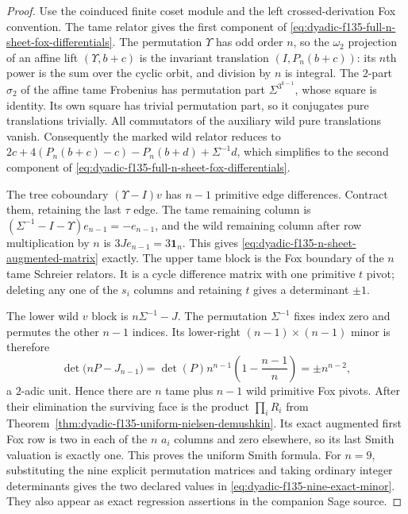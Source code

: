 \begin{proof}
Use the coinduced
finite coset module
and the left
crossed-derivation
Fox convention.
The tame relator
gives the first
component of
\eqref{eq:dyadic-f135-full-n-sheet-fox-differentials}.
The permutation
$\Upsilon$ has
odd order $n$,
so the $\omega_2$
projection of an
affine lift
$(\Upsilon,b+c)$
is the invariant
translation
$(I,P_n(b+c))$:
its $n$th power
is the sum over
the cyclic orbit,
and division by
$n$ is integral.
The $2$-part
$\sigma_2$ of
the affine tame
Frobenius has
permutation part
$\Sigma^{3^{k-1}}$,
whose square is
identity.
Its own square
has trivial
permutation part,
so it conjugates
pure translations
trivially.
All commutators
of the auxiliary
wild pure
translations vanish.
Consequently the
marked wild relator
reduces to
$2c+4(P_n(b+c)-c)
-P_n(b+d)+\Sigma^{-1}d$,
which simplifies
to the second
component of
\eqref{eq:dyadic-f135-full-n-sheet-fox-differentials}.

The tree coboundary
$(\Upsilon-I)v$
has $n-1$ primitive
edge differences.
Contract them,
retaining the last
$\tau$ edge.
The tame remaining
column is
$(\Sigma^{-1}-I-\Upsilon)
e_{n-1}=-e_{n-1}$,
and the wild
remaining column
after row
multiplication by
$n$ is
$3J e_{n-1}
=3\mathbf1_n$.
This gives
\eqref{eq:dyadic-f135-n-sheet-augmented-matrix}
exactly.
The upper tame
block is the
Fox boundary of
the $n$ tame
Schreier relators.
It is a cycle
difference matrix
with one
primitive $t$ pivot;
deleting any
one of the
$s_i$ columns
and retaining
$t$ gives a
determinant $\pm1$.

The lower wild
$v$ block is
$n\Sigma^{-1}-J$.
The permutation
$\Sigma^{-1}$
fixes index zero
and permutes the
other $n-1$
indices.
Its lower-right
$(n-1)\times(n-1)$
minor is therefore
\[
\det\bigl(
nP-J_{n-1}\bigr)
=\det(P)n^{n-1}
\left(1-\frac{n-1}{n}\right)
=\pm n^{n-2},
\]
a $2$-adic unit.
Hence there are
$n$ tame plus
$n-1$ wild
primitive Fox
pivots.
After their
elimination the
surviving face
is the product
$\prod_iR_i$
from
Theorem~\ref{thm:dyadic-f135-uniform-nielsen-demushkin}.
Its exact
augmented first
Fox row is two
in each of the
$n$ $a_i$ columns
and zero elsewhere,
so its last
Smith valuation
is exactly one.
This proves the
uniform Smith
formula.
For $n=9$,
substituting the
nine explicit
permutation
matrices and
taking ordinary
integer determinants
gives the two
declared values
in
\eqref{eq:dyadic-f135-nine-exact-minor}.
They also appear
as exact
regression assertions
in the companion
Sage source.
\end{proof}


